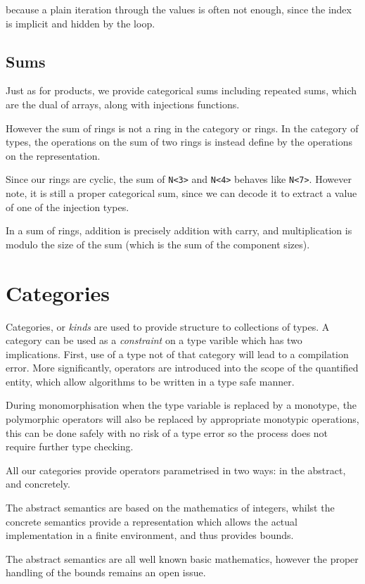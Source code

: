 because a plain iteration through the values is often not enough,
since the index is implicit and hidden by the loop.

\section{Sums}
Just as for products, we provide categorical sums including
repeated sums, which are the dual of arrays, along with 
injections functions.

However the sum of rings is not a ring in the category or rings.
In the category of types, the operations on the sum of two rings
is instead define by the operations on the representation.

Since our rings are cyclic, the sum of \verb$N<3>$ and \verb$N<4>$ behaves like
\verb$N<7>$. However note, it is still a proper categorical sum, since we
can decode it to extract a value of one of the injection types.

In a sum of rings, addition is precisely addition with carry,
and multiplication is modulo the size of the sum (which is the
sum of the component sizes).

\chapter{Categories}
Categories, or {\em kinds} are used to provide structure to collections of types.
A category can be used as a {\em constraint} on a type varible which has two
implications. First, use of a type not of that category will lead to a compilation
error. More significantly, operators are introduced into the scope of the quantified
entity, which allow algorithms to be written in a type safe manner.

During monomorphisation when the type variable is replaced by a monotype,
the polymorphic operators will also be replaced by appropriate monotypic
operations, this can be done safely with no risk of a type error so
the process does not require further type checking.

All our categories provide operators parametrised in two ways:
in the abstract, and concretely.

The abstract semantics are based on the mathematics of integers,
whilst the concrete semantics provide a representation which
allows the actual implementation in a finite environment,
and thus provides bounds.

The abstract semantics are all well known basic mathematics,
however the proper handling of the bounds remains an open issue.

